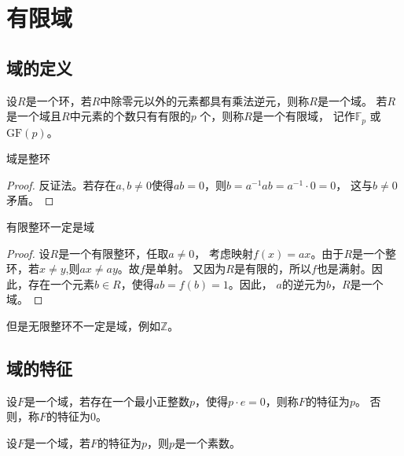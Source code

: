 \chapter{有限域}

\section{域的定义}

\begin{definition}
    设\(R\)是一个环，若\(R\)中除零元以外的元素都具有乘法逆元，则称\(R\)是一个域。
    若\(R\)是一个域且\(R\)中元素的个数只有有限的\(p\) 个，则称\(R\)是一个有限域，
    记作\(\mathbb{F}_{p}\) 或\(\mathrm{GF}(p)\)。
\end{definition}


\begin{theorem}[]
    域是整环
\end{theorem}

\begin{proof}
    反证法。若存在\(a,b\neq 0\)使得\(ab=0\)，则\(b=a^{-1}ab=a^{-1} \cdot 0=0\)，
    这与\(b\neq 0\)矛盾。
\end{proof}

\begin{theorem}
    有限整环一定是域
\end{theorem}

\begin{proof}
    设\(R\)是一个有限整环，任取\(a\neq 0\)，
    考虑映射\(f(x)=ax\)。由于\(R\)是一个整环，若\(x\neq y\),则\(ax\neq ay\)。故\(f\)是单射。
    又因为\(R\)是有限的，所以\(f\)也是满射。因此，存在一个元素\(b\in R\)，使得\(ab=f(b)=1\)。因此，
    \(a\)的逆元为\(b\)，\(R\)是一个域。
\end{proof}

但是无限整环不一定是域，例如\(\mathbb{Z}\)。

\section{域的特征}

\begin{definition}[域的特征]
    设\(F\)是一个域，若存在一个最小正整数\(p\)，使得\(p \cdot e = 0\)，则称\(F\)的特征为\(p\)。
    否则，称\(F\)的特征为\(0\)。
\end{definition}

\begin{theorem}[域的特征为素数]
    设\(F\)是一个域，若\(F\)的特征为\(p \)，则\(p\)是一个素数。
\end{theorem}


